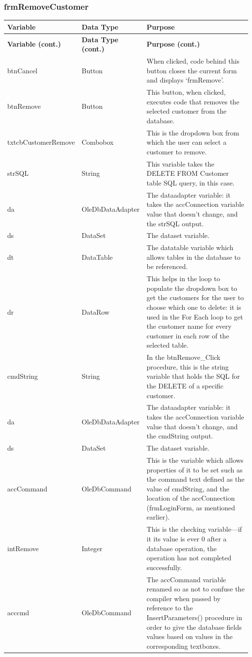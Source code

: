	\subsubsection{frmRemoveCustomer}
	\begin{longtable}{| p{4cm} | p{3cm} | p{10cm} |}
		\hline
		\textbf{Variable} & \textbf{Data Type} & \textbf{Purpose}\\
		\endfirsthead
		\hline
		\textbf{Variable (cont.)} & \textbf{Data Type (cont.)} & \textbf{Purpose (cont.)}\\
		\endhead
		\hline
		btnCancel & Button & When clicked, code behind this button closes the current form and displays `frmRemove'.\\
		\hline
		btnRemove & Button & This button, when clicked, executes code that removes the selected customer from the database.\\
		\hline
		txtcbCustomerRemove & Combobox & This is the dropdown box from which the user can select a customer to remove.\\
		\hline
		strSQL & String &  This variable takes the DELETE FROM Customer table SQL query, in this case.\\
		\hline
		da & OleDbDataAdapter & The dataadapter variable: it takes the accConnection variable value that doesn't change, and the strSQL output.\\
		\hline
		ds & DataSet & The dataset variable.\\
		\hline
		dt & DataTable & The datatable variable which allows tables in the database to be referenced.\\
		\hline
		dr & DataRow & This helps in the loop to populate the dropdown box to get the customers for the user to choose which one to delete: it is used in the For Each loop to get the customer name for every customer in each row of the selected table.\\
		\hline
		cmdString & String & In the btnRemove\_Click procedure, this is the string variable that holds the SQL for the DELETE of a specific customer.\\
		\hline
		da & OleDbDataAdapter & The dataadapter variable: it takes the accConnection variable value that doesn't change, and the cmdString output.\\
		\hline
		ds & DataSet & The dataset variable.\\
		\hline
		accCommand & OleDbCommand & This is the variable which allows properties of it to be set such as the command text defined as the value of cmdString, and the location of the accConnection (frmLoginForm, as mentioned earlier).\\
		\hline
		intRemove & Integer & This is the checking variable---if it its value is ever 0 after a database operation, the operation has not completed successfully.\\
		\hline
		acccmd & OleDbCommand & The accCommand variable renamed so as not to confuse the compiler when passed by reference to the InsertParameters() procedure in order to give the database fields values based on values in the corresponding textboxes.\\
		\hline
	\end{longtable}
	
